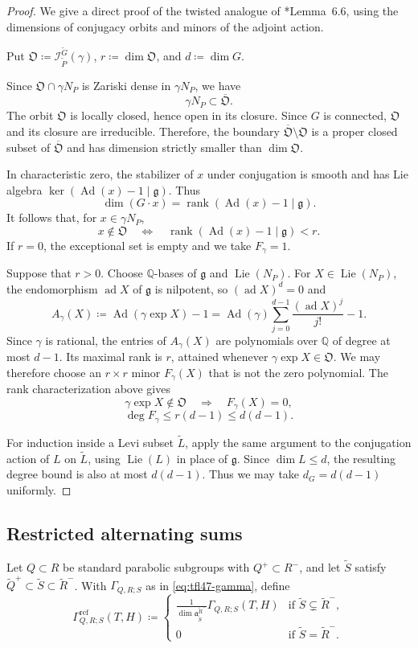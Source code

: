 \documentclass[12pt]{amsart}
\theoremstyle{definition}
\theoremstyle{plain}
\theoremstyle{remark}
\def\Q{\mathbb{Q}}%
\DeclareMathOperator{\rank}{rank}%
\DeclareMathOperator{\Lie}{Lie}%
\DeclareMathOperator{\Ad}{Ad}%
\DeclareMathOperator{\ad}{ad}%
\newcommand{\fa}{\mathfrak{a}}
\newcommand{\fg}{\mathfrak{g}}
\newcommand{\cI}{\mathcal{I}}
\numberwithin{equation}{section}
\newcommand{\tG}{\widetilde{G}}
\newcommand{\tL}{\widetilde{L}}
\newcommand{\tP}{\widetilde{P}}
\newcommand{\tQ}{\widetilde{Q}}
\newcommand{\tR}{\widetilde{R}}
\newcommand{\tS}{\widetilde{S}}
\newcommand{\fO}{\mathfrak{O}}
\begin{document}
\begin{proof}
We give a direct proof of the twisted analogue of
\cite{FL16}*{Lemma~6.6}, using the dimensions of conjugacy
orbits and minors of the adjoint action.

Put $\fO\coloneqq \cI_{\tP}^{\tG}(\gamma)$, $r\coloneqq \dim\fO$, and $d\coloneqq \dim G$. 

Since $\fO\cap\gamma N_P$ is Zariski dense in
$\gamma N_P$, we have
\[
 \gamma N_P\subset\overline{\fO}.
\]
The orbit $\fO$ is locally closed, hence open in its closure.
Since $G$ is connected, $\fO$ and its closure are irreducible.
Therefore, the boundary $\overline{\fO}\setminus\fO$
is a proper closed subset of $\overline{\fO}$ and has
dimension strictly smaller than $\dim\fO$.


In characteristic zero, the stabilizer of $x$ under
conjugation is smooth and has Lie algebra
$\ker(\Ad(x)-1\mid\fg)$.
Thus
\[
 \dim(G\cdot x)=\rank(\Ad(x)-1\mid\fg).
\]
It follows that, for $x\in\gamma N_P$,
\[
 x\notin\fO
 \quad\Longleftrightarrow\quad
 \rank(\Ad(x)-1\mid\fg)<r.
\]
If $r=0$, the exceptional set is empty and we take
$F_\gamma=1$.

Suppose that $r>0$.
Choose $\Q$-bases of $\fg$ and $\Lie(N_P)$.
For $X\in\Lie(N_P)$, the endomorphism $\ad X$ of $\fg$
is nilpotent, so $(\ad X)^d=0$ and
\[
 A_\gamma(X)
 \coloneqq\Ad(\gamma\exp X)-1
 =\Ad(\gamma)\sum_{j=0}^{d-1}
       \frac{(\ad X)^j}{j!}-1.
\]
Since $\gamma$ is rational, the entries of $A_\gamma(X)$
are polynomials over $\Q$ of degree at most $d-1$.
Its maximal rank is $r$, attained whenever
$\gamma\exp X\in\fO$.
We may therefore choose an $r\times r$ minor
$F_\gamma(X)$ that is not the zero polynomial.
The rank characterization above gives
\[
 \gamma\exp X\notin\fO
 \quad\Longrightarrow\quad F_\gamma(X)=0,
\]
\[
 \deg F_\gamma\le r(d-1)\le d(d-1).
\]

For induction inside a Levi subset $\tL$, apply the same
argument to the conjugation action of $L$ on $\tL$,
using $\Lie(L)$ in place of $\fg$.
Since $\dim L\le d$, the resulting degree bound is also
at most $d(d-1)$.
Thus we may take $d_G=d(d-1)$ uniformly.
\end{proof}


\subsection{Restricted alternating sums}

Let $Q\subset R$ be standard parabolic subgroups with
$Q^+\subset R^-$, and let $\tS$ satisfy
$\tQ^+\subset\tS\subset\tR^-$.
With $\Gamma_{Q,R;S}$ as in \eqref{eq:tfl47-gamma}, define
\begin{equation}\label{fg:normalized-gamma}
 \Gamma^{\mathrm{ref}}_{Q,R;S}(T,H)
   \coloneqq \begin{cases}
      \frac{1}{\dim\fa_{\tS}^{\tR^-}}\Gamma_{Q,R;S}(T,H)&\text{if $\tS\subsetneq \tR^-$},\\
      0& \text{if $\tS= \tR^-$}.
     \end{cases}
\end{equation}
\end{document}
